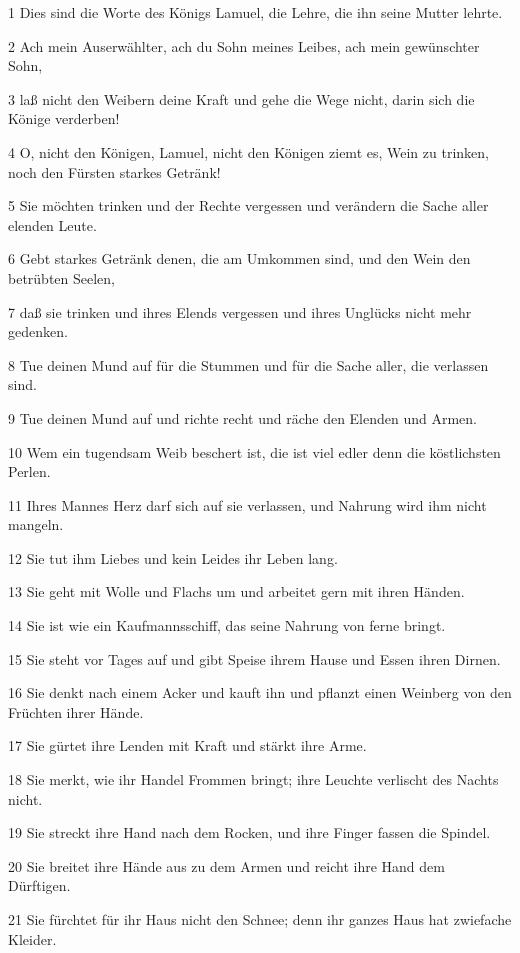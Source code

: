 \par 1 Dies sind die Worte des Königs Lamuel, die Lehre, die ihn seine Mutter lehrte.
\par 2 Ach mein Auserwählter, ach du Sohn meines Leibes, ach mein gewünschter Sohn,
\par 3 laß nicht den Weibern deine Kraft und gehe die Wege nicht, darin sich die Könige verderben!
\par 4 O, nicht den Königen, Lamuel, nicht den Königen ziemt es, Wein zu trinken, noch den Fürsten starkes Getränk!
\par 5 Sie möchten trinken und der Rechte vergessen und verändern die Sache aller elenden Leute.
\par 6 Gebt starkes Getränk denen, die am Umkommen sind, und den Wein den betrübten Seelen,
\par 7 daß sie trinken und ihres Elends vergessen und ihres Unglücks nicht mehr gedenken.
\par 8 Tue deinen Mund auf für die Stummen und für die Sache aller, die verlassen sind.
\par 9 Tue deinen Mund auf und richte recht und räche den Elenden und Armen.
\par 10 Wem ein tugendsam Weib beschert ist, die ist viel edler denn die köstlichsten Perlen.
\par 11 Ihres Mannes Herz darf sich auf sie verlassen, und Nahrung wird ihm nicht mangeln.
\par 12 Sie tut ihm Liebes und kein Leides ihr Leben lang.
\par 13 Sie geht mit Wolle und Flachs um und arbeitet gern mit ihren Händen.
\par 14 Sie ist wie ein Kaufmannsschiff, das seine Nahrung von ferne bringt.
\par 15 Sie steht vor Tages auf und gibt Speise ihrem Hause und Essen ihren Dirnen.
\par 16 Sie denkt nach einem Acker und kauft ihn und pflanzt einen Weinberg von den Früchten ihrer Hände.
\par 17 Sie gürtet ihre Lenden mit Kraft und stärkt ihre Arme.
\par 18 Sie merkt, wie ihr Handel Frommen bringt; ihre Leuchte verlischt des Nachts nicht.
\par 19 Sie streckt ihre Hand nach dem Rocken, und ihre Finger fassen die Spindel.
\par 20 Sie breitet ihre Hände aus zu dem Armen und reicht ihre Hand dem Dürftigen.
\par 21 Sie fürchtet für ihr Haus nicht den Schnee; denn ihr ganzes Haus hat zwiefache Kleider.
